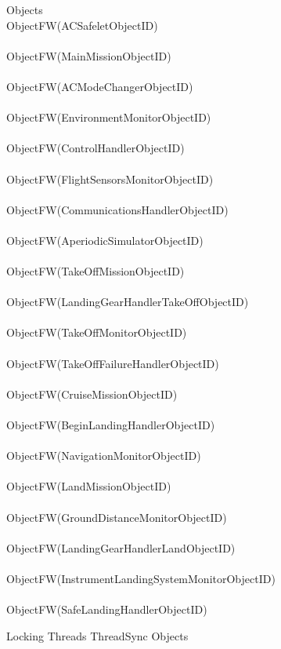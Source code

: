 \begin{circus}
\circprocess Objects \circdef \\
\circblockopen
ObjectFW(ACSafeletObjectID) \\
\interleave \\
ObjectFW(MainMissionObjectID) \\
\interleave \\
ObjectFW(ACModeChangerObjectID) \\
\interleave \\
ObjectFW(EnvironmentMonitorObjectID) \\
\interleave \\
ObjectFW(ControlHandlerObjectID) \\
\interleave \\
ObjectFW(FlightSensorsMonitorObjectID) \\
\interleave \\
ObjectFW(CommunicationsHandlerObjectID) \\
\interleave \\
ObjectFW(AperiodicSimulatorObjectID) \\
\interleave \\
ObjectFW(TakeOffMissionObjectID) \\
\interleave \\
ObjectFW(LandingGearHandlerTakeOffObjectID) \\
\interleave \\
ObjectFW(TakeOffMonitorObjectID) \\
\interleave \\
ObjectFW(TakeOffFailureHandlerObjectID) \\
\interleave \\
ObjectFW(CruiseMissionObjectID) \\
\interleave \\
ObjectFW(BeginLandingHandlerObjectID) \\
\interleave \\
ObjectFW(NavigationMonitorObjectID) \\
\interleave \\
ObjectFW(LandMissionObjectID) \\
\interleave \\
ObjectFW(GroundDistanceMonitorObjectID) \\
\interleave \\
ObjectFW(LandingGearHandlerLandObjectID) \\
\interleave \\
ObjectFW(InstrumentLandingSystemMonitorObjectID) \\
\interleave \\
ObjectFW(SafeLandingHandlerObjectID) \\

\circblockclose
\end{circus}
%
%
\begin{circus}
\circprocess Locking \circdef Threads \lpar ThreadSync \rpar Objects
\end{circus}
